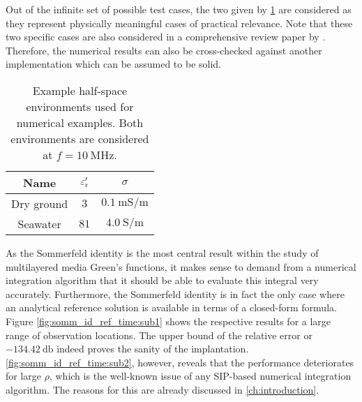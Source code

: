 Out of the infinite set of possible test cases, the two given by
\cref{tab:numerical_examples_half_spaces} are considered as they
represent physically meaningful cases of practical relevance.
Note that these two specific cases are also considered in a comprehensive
review paper by \textcite{Michalski2016b}.
Therefore, the numerical results can also be cross-checked against another
implementation which can be assumed to be solid.
\begin{table}[hbt]
	\centering
	\begin{tabular}{ccc}
		\toprule%
		Name & $\varepsilon_{\mathrm{r}}^\prime$ & $\sigma$ \\
		\midrule
		Dry ground & $\num{3}$  & $\SI{0.1}{\milli\siemens\per\metre}$ \\
		Seawater   & $\num{81}$ & $\SI{4.0}{\siemens\per\metre}$ \\
		\bottomrule
	\end{tabular}
	\caption[Example half-space environments]
	{Example half-space environments used for numerical examples.
    Both environments are considered at $f = \SI{10}{\mega\hertz}$.}
	\label{tab:numerical_examples_half_spaces}
\end{table}

As the Sommerfeld identity is the most central result within the study of
multilayered media Green's functions, it makes sense to demand from a numerical
integration algorithm that it should be able to evaluate this integral very
accurately.
Furthermore, the Sommerfeld identity is in fact the only case where an
analytical reference solution is available in terms of a closed-form formula.
Figure \cref{fig:somm_id_ref_time:sub1} shows the respective results for a large
range of observation locations.
The upper bound of the relative error or $\SI{-134.42}{\decibel}$ indeed
proves the sanity of the implantation.
\cref{fig:somm_id_ref_time:sub2}, however, reveals that the performance
deteriorates for large $\rho$, which is the well-known issue of any
\ac{SIP}-based numerical integration algorithm.
The reasons for this are already discussed in \cref{ch:introduction}.

